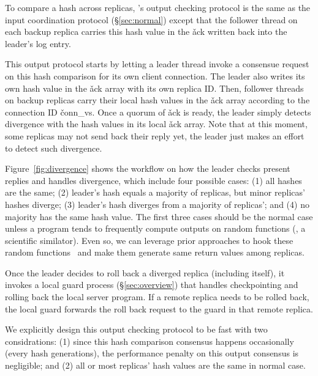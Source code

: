 To compare a hash across replicas, \xxx's output checking protocol is the same 
as the input coordination protocol (\S\ref{sec:normal}) except that the 
follower thread on each backup replica carries this hash value in the \v{ack} 
written back into the leader's log entry.

This output protocol starts by letting a leader thread invoke a consensue 
request on this hash comparison for its own client connection. The leader also 
writes its own hash value in the \v{ack} array with its own replica ID. Then, 
follower threads on backup replicas carry their local hash values in the \v{ack} 
array according to the connection ID \v{conn\_vs}. Once a quorum of \v{ack} 
is ready, the leader simply detects divergence with the hash values in its 
local \v{ack} array. Note that at this moment, some replicas may not send back 
their reply yet, the leader just makes an effort to detect such divergence.

Figure~\ref{fig:divergence} shows the workflow on how the leader checks 
present replies and handles divergence, which include four possible cases: 
(1) all hashes are the same; (2) leader's hash equals a majority of replicas, 
but minor replicas' hashes diverge; (3) leader's hash diverges from a majority 
of replicas'; and (4) no majority has the same hash value. The first three 
cases should be the normal case unless a program tends to frequently compute 
outputs on random functions (\eg, a scientific similator). Even so, we can 
leverage prior approaches to hook these 
random functions~\cite{paxos:practical,eve:osdi12} and make them generate same 
return values among replicas.

Once the leader decides to roll back a diverged replica (including itself), it 
invokes a local guard process (\S\ref{sec:overview}) that handles 
checkpointing and rolling back the local server program. If a remote replica 
needs to be rolled back, the local guard forwards the roll back request to the 
guard in that remote replica.

We explicitly design this output checking protocol to be fast with two 
considrations: (1) since this hash comparison consensus happens occasionally 
(every \thashcomp hash generations), the performance penalty on this output 
consensus is negligible; and (2) all or most replicas' hash values are 
the same in normal case.


